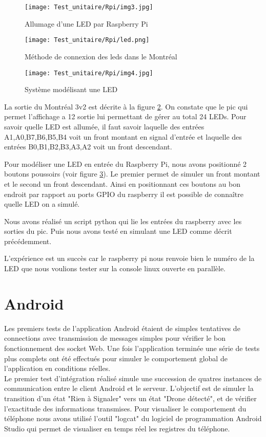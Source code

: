 \begin{figure}[!h]
  \texttt{[image: Test\_unitaire/Rpi/img3.jpg]}
  \caption{Allumage d'une LED par Raspberry Pi}
  \label{figure:led}
\end{figure}

\begin{figure}[!h]
  \centering
  \texttt{[image: Test\_unitaire/Rpi/led.png]}
  \caption{Méthode de connexion des leds dans le Montréal}  
  \label{figure:ledMontreal}
\end{figure}
\begin{figure}[!h]
  \centering
  \texttt{[image: Test\_unitaire/Rpi/img4.jpg]}  
  \caption{Système modélisant une LED}
  \label{figure:test}
\end{figure}

La sortie du Montréal 3v2 est décrite à la figure \ref{figure:ledMontreal}. On constate que le pic qui permet l'affichage a 12 sortie lui permettant de gérer au total 24 LEDs. Pour savoir quelle LED est allumée, il faut savoir laquelle des entrées A1,A0,B7,B6,B5,B4 voit un front montant en signal d'entrée et laquelle des entrées B0,B1,B2,B3,A3,A2 voit un front descendant.

Pour modéliser une LED en entrée du Raspberry Pi, nous avons positionné 2 boutons poussoirs (voir figure \ref{figure:test}). Le premier permet de simuler un front montant et le second un front descendant. Ainsi en positionnant ces boutons au bon endroit par rapport au ports GPIO du raspberry il est possible de connaître quelle LED on a simulé.

Nous avons réalisé un script python qui lie les entrées du raspberry avec les sorties du pic. Puis nous avons testé en simulant une LED comme décrit précédemment.

L'expérience est un succès car le raspberry pi nous renvoie bien le numéro de la LED que nous voulions tester sur la console linux ouverte en parallèle.


\section{Android}

Les premiers tests de l'application Android étaient de simples tentatives de connections avec transmission de messages simples pour vérifier le bon fonctionnement des socket Web. 
Une fois l'application terminée une série de tests plus complets ont été effectués pour simuler le comportement global de l'application en conditions réelles.
~\\
Le premier test d'intégration réalisé simule une succession de quatres instances de communication entre le client Android et le serveur. L'objectif est de simuler la transition d'un état "Rien à Signaler" vers un état "Drone détecté", et de vérifier l'exactitude des informations transmises. Pour visualiser le comportement du téléphone nous avons utilisé l'outil "logcat" du logiciel de programmation Android Studio qui permet de visualiser en temps réel les registres du téléphone. 

